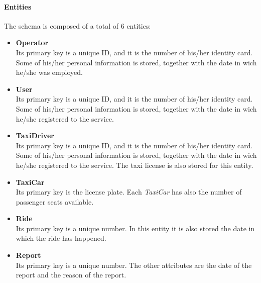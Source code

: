 \paragraph{Entities} %
\label{par:entities}
The schema is composed of a total of 6 entities:

\begin{itemize}
	\item {\textbf{Operator}} \\
		Its primary key is a unique ID, and it is the number of his/her identity card.
		Some of his/her personal information is stored, together with the date in wich he/she was employed.
	\item {\textbf{User}} \\
		Its primary key is a unique ID, and it is the number of his/her identity card.
		Some of his/her personal information is stored, together with the date in wich he/she registered to the service.
	\item {\textbf{TaxiDriver}} \\
		Its primary key is a unique ID, and it is the number of his/her identity card.
		Some of his/her personal information is stored, together with the date in wich he/she registered to the service.
		The taxi license is also stored for this entity.
	\item {\textbf{TaxiCar}} \\
		Its primary key is the license plate. Each \emph{TaxiCar} has also the number of passenger seats available.
	\item {\textbf{Ride}} \\
		Its primary key is a unique number. In this entity it is also stored the date in which the ride has happened.
	\item {\textbf{Report}} \\
		Its primary key is a unique number. The other attributes are the date of the report and the reason of the report.
\end{itemize}


\newpage
